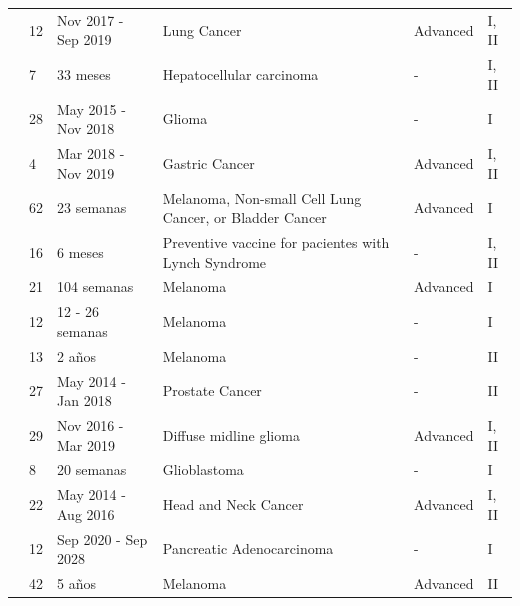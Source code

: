 \begin{table}[h]
{{\begin{tabular}{p{2.8cm}p{0.5cm}p{2.3cm}p{4.5cm}p{1.5cm}p{0.5cm}}
				\cite{cheng2021bertmhc} & 12  & Nov 2017 - Sep 2019 & Lung Cancer & Advanced & I, II \\
				
				\cite{cai2021personalized} & 7  & 33 meses & Hepatocellular carcinoma & -& I, II \\
				
				\cite{platten2021vaccine} & 28  & May 2015 - Nov 2018 & Glioma & -& I \\
				
				
				\cite{cafri2020mrna} & 4  & Mar 2018 - Nov 2019 & Gastric Cancer & Advanced & I, II \\
				
				
				
				
				
				
				\cite{ott2020phase} & 62  & 23 semanas & Melanoma, Non-small Cell Lung Cancer, or Bladder Cancer & Advanced & I \\
				
				
				\cite{kloor2020frameshift} & 16  & 6 meses & Preventive vaccine for pacientes with Lynch Syndrome  &- & I, II \\
				
				
				
				\cite{poran2020combined} & 21  & 104 semanas & Melanoma & Advanced & I \\
				
				\cite{engelhard2020mhc} & 12  & 12 - 26 semanas & Melanoma &- & I \\
				
				\cite{podaza2020evaluation} & 13  & 2 años & Melanoma & -& II \\
				
				\cite{sater2020neoadjuvant} & 27  & May 2014 - Jan 2018 & Prostate Cancer & -& II \\ 
				
				\cite{mueller2022mass} & 29  & Nov 2016 - Mar 2019 & Diffuse midline glioma & Advanced & I, II \\
				
				\cite{keskin2019neoantigen} & 8  & 20 semanas & Glioblastoma & -& I \\
				
				
				\cite{aggarwal2019immunotherapy} & 22  & May 2014 - Aug 2016 & Head and Neck Cancer & Advanced & I, II \\
				
				
				
				
				
				\cite{bassani2019phase} & 12  & Sep 2020 - Sep 2028 & Pancreatic Adenocarcinoma &- & I \\
				
				
				
				
				
				\cite{dillman2018randomized} & 42  & 5 años & Melanoma & Advanced & II \\
			\end{tabular}
		}
	}
\end{table}

